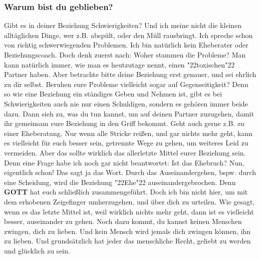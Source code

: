 \documentclass[12pt,a5paper]{article}
\newcommand{\Gott}[0]{\textbf{GOTT}}
\newcommand{\q}[1]{\char"22{#1}\char"22 }
\begin{document}
	\subsubsection{Warum bist du geblieben?}
		Gibt es in deiner Beziehung Schwierigkeiten?
		Und ich meine nicht die kleinen allt\"aglichen Dinge,
		wer z.B. absp\"ult,
		oder den M\"ull rausbringt.
		Ich spreche schon von richtig schwerwiegenden Problemen.
		Ich bin nat\"urlich kein Eheberater oder Beziehungscoach.
		Doch denk zuerst nach:
		Woher stammen die Probleme?
		Man kann nat\"urlich immer,
		wie man es heutzutage nennt,
		einen \q{toxischen} Partner haben.
		Aber betrachte bitte deine Beziehung erst genauer,
		und sei ehrlich zu dir selbst.
		Beruhen eure Probleme vielleicht sogar auf Gegenseitigkeit?
		Denn so wie eine Beziehung ein st\"andiges Geben und Nehmen ist,
		gibt es bei Schwierigkeiten auch nie nur einen Schuldigen,
		sondern es geh\"oren immer beide dazu.
		Dann sieh zu,
		was du tun kannst,
		um auf deinen Partner zuzugehen,
		damit ihr gemeinsam eure Beziehung in den Griff bekommt.
		Geht auch gerne z.B. zu einer Eheberatung.
		Nur wenn alle Stricke rei{\ss}en,
		und gar nichts mehr geht,
		kann es vielleicht f\"ur euch besser sein,
		getrennte Wege zu gehen,
		um weiteres Leid zu vermeiden.
		Aber das sollte wirklich das allerletzte Mittel eurer Beziehung sein.
		\\
		Denn eine Frage habe ich noch gar nicht beantwortet:
		Ist das Ehebruch?
		Nun, eigentlich schon!
		Das sagt ja das Wort.
		Durch das Auseinandergehen,
		bspw. durch eine Scheidung,
		wird die Beziehung \q{Ehe} auseinandergebrochen.
		Denn {\Gott} hat euch schlie{\ss}lich zusammengef\"uhrt.
		Doch ich bin nicht hier,
		um mit dem erhobenen Zeigefinger umherzugehen,
		und \"uber dich zu urteilen.
		Wie gesagt,
		wenn es das letzte Mittel ist,
		weil wirklich nichts mehr geht,
		dann ist es vielleicht besser,
		auseinander zu gehen.
		Noch dazu kommt,
		du kannst keinen Menschen zwingen,
		dich zu lieben.
		Und kein Mensch wird jemals dich zwingen k\"onnen,
		ihn zu lieben.
		Und grunds\"atzlich hat jeder das menschliche Recht,
		geliebt zu werden und gl\"ucklich zu sein.
		
\end{document}
